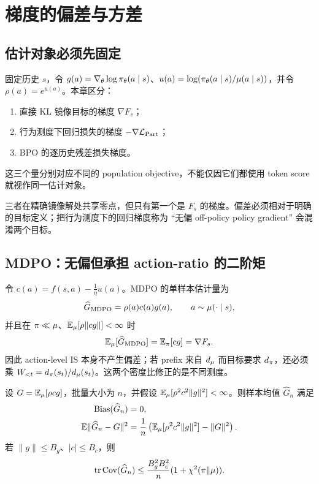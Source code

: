 \chapter{梯度的偏差与方差}
\label{ch:bias-variance}

\section{估计对象必须先固定}

\begin{definition}[三类需要区分的梯度对象]
\label{def:ch3-gradient-objects}
固定历史 $s$，令 $g(a)=\nabla_\theta\log\pi_\theta(a\mid s)$、$u(a)=\log(\pi_\theta(a\mid s)/\mu(a\mid s))$，并令 $\rho(a)=e^{u(a)}$。本章区分：
\begin{enumerate}[label=(\roman*)]
    \item 直接 KL 镜像目标的梯度 $\nabla F_s$；
    \item 行为测度下回归损失的梯度 $-\nabla\mathcal L_{\rm Part}$；
    \item BPO 的逐历史残差损失梯度。
\end{enumerate}
这三个量分别对应不同的 population objective，不能仅因它们都使用 token score 就视作同一估计对象。
\end{definition}

三者在精确镜像解处共享零点，但只有第一个是 $F_s$ 的梯度。偏差必须相对于明确的目标定义；把行为测度下的回归梯度称为 ``无偏 off-policy policy gradient'' 会混淆两个目标。

\section{MDPO：无偏但承担 action-ratio 的二阶矩}

令 $c(a)=f(s,a)-\frac1\eta u(a)$。MDPO 的单样本估计量为
\begin{equation}
\widehat G_{\rm MDPO}=\rho(a)c(a)g(a),\qquad a\sim\mu(\cdot\mid s),
\end{equation}
并且在 $\pi\ll\mu$、$\mathbb{E}_\mu[\rho\lVert cg\rVert]<\infty$ 时
\begin{equation}
\mathbb{E}_\mu[\widehat G_{\rm MDPO}]=\mathbb{E}_\pi[cg]=\nabla F_s.
\end{equation}
因此 action-level IS 本身不产生偏差；若 prefix 来自 $d_\mu$ 而目标要求 $d_\pi$，还必须乘 $W_{<t}=d_\pi(s_t)/d_\mu(s_t)$。这两个密度比修正的是不同测度。

\begin{theorem}
\label{thm:mdpo-exact-mse}
设 $G=\mathbb{E}_\mu[\rho cg]$，批量大小为 $n$，并假设 $\mathbb{E}_\mu[\rho^2c^2\lVert g\rVert^2]<\infty$。则样本均值 $\widehat G_n$ 满足
\begin{align}
\operatorname{Bias}(\widehat G_n)&=0,\\
\mathbb{E}\lVert\widehat G_n-G\rVert^2
&=\frac1n\left(\mathbb{E}_\mu[\rho^2c^2\lVert g\rVert^2]-\lVert G\rVert^2\right).
\end{align}
若 $\lVert g\rVert\leq B_g$、$|c|\leq B_c$，则
\begin{equation}
\operatorname{tr}\operatorname{Cov}(\widehat G_n)
\leq\frac{B_g^2B_c^2}{n}(1+\chi^2(\pi\Vert\mu)).
\end{equation}
\end{theorem}


